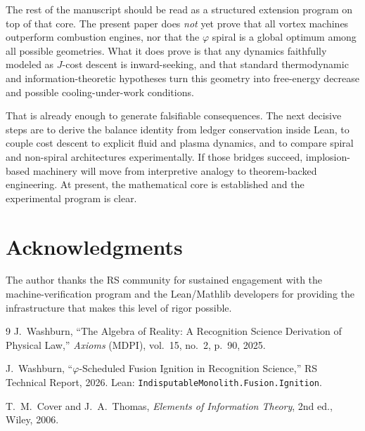 \documentclass[11pt,a4paper]{article}
\theoremstyle{definition}
\newcommand{\phig}{\varphi}
\newcommand{\Jc}{J}
\newcommand{\code}[1]{\texttt{\small #1}}
\begin{document}
The rest of the manuscript should be read as a structured extension program on
top of that core.  The present paper does \emph{not} yet prove that all vortex
machines outperform combustion engines, nor that the $\phig$ spiral is a global
optimum among all possible geometries.  What it does prove is that any
dynamics faithfully modeled as $\Jc$-cost descent is inward-seeking, and that
standard thermodynamic and information-theoretic hypotheses turn this geometry
into free-energy decrease and possible cooling-under-work conditions.

That is already enough to generate falsifiable consequences.  The next decisive
steps are to derive the balance identity from ledger conservation inside Lean,
to couple cost descent to explicit fluid and plasma dynamics, and to compare
spiral and non-spiral architectures experimentally.  If those bridges succeed,
implosion-based machinery will move from interpretive analogy to
theorem-backed engineering.  At present, the mathematical core is established
and the experimental program is clear.

\section*{Acknowledgments}

The author thanks the RS community for sustained engagement with the
machine-verification program and the Lean/Mathlib developers for providing
the infrastructure that makes this level of rigor possible.

\begin{thebibliography}{9}
  J.~Washburn,
  ``The Algebra of Reality: A Recognition Science Derivation of Physical Law,''
  \emph{Axioms} (MDPI), vol.~15, no.~2, p.~90, 2025.

  J.~Washburn,
  ``$\varphi$-Scheduled Fusion Ignition in Recognition Science,''
  RS Technical Report, 2026.
  Lean: \code{IndisputableMonolith.Fusion.Ignition}.

  T.~M.~Cover and J.~A.~Thomas,
  \emph{Elements of Information Theory},
  2nd ed., Wiley, 2006.
\end{thebibliography}
\end{document}
